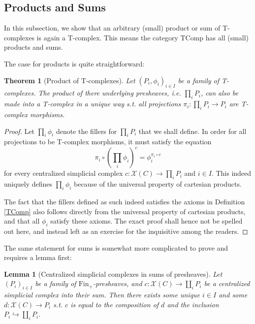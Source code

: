 \documentclass{article}
\newtheorem{theorem}{Theorem}[subsection]
\newtheorem{lemma}{Lemma}[subsection]
\theoremstyle{remark}
\theoremstyle{definition}
\newcommand{\Fin}{\mathrm{Fin}}
\newcommand{\X}{\mathcal X}
\newcommand{\TComp}{\mathrm{TComp}}
\begin{document}
	\subsection{Products and Sums}
	In this subsection, we show that an arbitrary (small) product or sum of T-complexes is again a T-complex. This means the category $\TComp$ has all (small) products and sums.
	
	The case for products is quite straightforward:
	\begin{theorem}[Product of T-complexes]
		Let $(P_i,\phi_i)_{i\in I}$ be a family of T-complexes. The product of there underlying presheaves, i.e. $\prod_iP_i$, can also be made into a T-complex in a unique way s.t. all projections $\pi_i:\prod_iP_i\to P_i$ are T-complex morphisms.
	\end{theorem}
	\begin{proof}
		Let $\prod_i\phi_i$ denote the fillers for $\prod_iP_i$ that we shall define. In order for all projections to be T-complex morphisms, it must satisfy the equation
		\begin{equation}\label{prodfill}
			\pi_i\circ\left(\prod_i\phi_i\right)^c=\phi_i^{\pi_i\circ c}
		\end{equation}
		for every centralized simplicial complex $c:\X(C)\to\prod_iP_i$ and $i\in I$. This indeed uniquely defines $\prod_i\phi_i$ because of the universal property of cartesian products.
		
		The fact that the fillers defined as such indeed satisfies the axioms in Definition \ref{TComp} also follows directly from the universal property of cartesian products, and that all $\phi_i$ satisfy these axioms. The exact proof shall hence not be spelled out here, and instead left as an exercise for the inquisitive among the readers.
	\end{proof}
	The same statement for sums is somewhat more complicated to prove and requires a lemma first:
	\begin{lemma}[Centralized simplicial complexes in sums of presheaves]\label{cscsum}
		Let $(P_i)_{i\in I}$ be a family of $\Fin_+$-presheaves, and $c:\X(C)\to\coprod_iP_i$ be a centralized simplicial complex into their sum. Then there exists some unique $i\in I$ and some $d:\X(C)\to P_i$ s.t. $c$ is equal to the composition of $d$ and the inclusion $P_i\hookrightarrow\coprod_iP_i$.
	\end{lemma}
\end{document}
